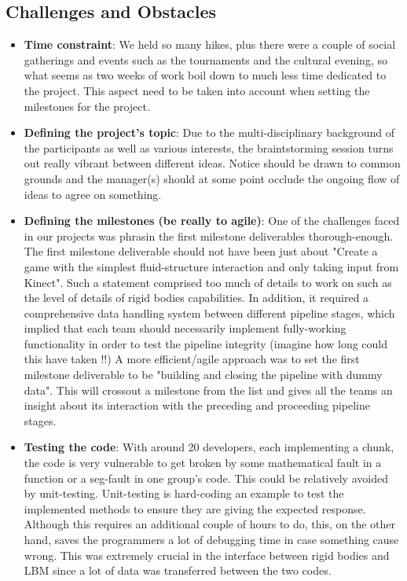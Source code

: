\subsection{Challenges and Obstacles}
\begin{itemize}
\item \textbf{Time constraint}: We held so many hikes, plus there were a couple of social gatherings and events such as the tournaments and the cultural evening, so what seems as two weeks of work boil down to much less time dedicated to the project. This aspect need to be taken into account when setting the milestones for the project.
\item \textbf{Defining the project's topic}: Due to the multi-disciplinary background of the participants as well as various interests, the braintstorming session turns out really vibrant between different ideas. Notice should be drawn to common grounds and the manager(s) should at some point occlude the ongoing flow of ideas to agree on something.
\item \textbf{Defining the milestones (be really to agile)}: One of the challenges faced in our projects was phrasin the first milestone deliverables thorough-enough. The first milestone deliverable should not have been just about "Create a game with the simplest fluid-structure interaction and only taking input from Kinect". Such a statement comprised too much of details to work on such as the level of details of rigid bodies capabilities. In addition, it required a comprehensive data handling system between different pipeline stages, which implied that each team should necessarily implement fully-working functionality in order to test the pipeline integrity (imagine how long could this have taken !!)
A more efficient/agile approach was to set the first milestone deliverable to be "building and closing the pipeline with dummy data". This will crossout a milestone from the list and gives all the teams an insight about its interaction with the preceding and proceeding pipeline stages.
\item \textbf{Testing the code}: With around 20 developers, each implementing a chunk, the code is very vulnerable to get broken by some mathematical fault in a function or a seg-fault in one group's code. This could be relatively avoided by unit-testing. Unit-testing is hard-coding an example to test the implemented methods to ensure they are giving the expected response. Although this requires an additional couple of hours to do, this, on the other hand, saves the programmers a lot of debugging time in case something cause wrong. This was extremely crucial in the interface between rigid bodies and LBM since a lot of data was transferred between the two codes.

\end{itemize}
